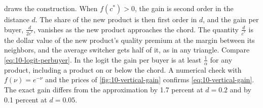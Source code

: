  draws the construction. When $f(c^*) > 0$, the gain is second order in the
distance $d$. The share of the new product is then first order in $d$, and the gain per buyer, $\frac{d}{2c^*}$,
vanishes as the new product approaches the chord. The quantity $\frac{d}{c^*}$ is the dollar value of the new product's quality premium at the margin
between its neighbors, and the average switcher gets half of it, as in any triangle. Compare
\eqref{eq:10-logit-perbuyer}. In the logit the gain per buyer is at least $\frac{1}{\alpha}$ for any product,
including a product on or below the chord. A numerical check with $f(\nu) = e^{-\nu}$ and the prices of
\cref{fig:10-vertical-gain} confirms \eqref{eq:10-vertical-gain}. The exact gain differs from the approximation by
1.7 percent at $d = 0.2$ and by 0.1 percent at $d = 0.05$.


